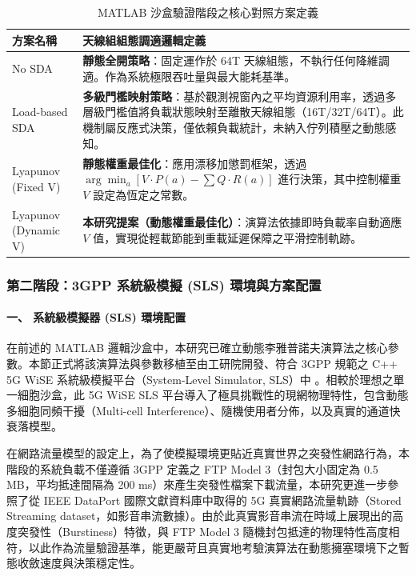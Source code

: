 \begin{table}[htbp]
\centering
\caption{MATLAB 沙盒驗證階段之核心對照方案定義}
\label{tab:matlab_schemes}
\renewcommand{\arraystretch}{1.5}
\begin{tabularx}{\textwidth}{|p{}|X|} %
\hline
\textbf{方案名稱} & \textbf{天線組組態調適邏輯定義} \\ \hline
No SDA & \textbf{靜態全開策略}：固定運作於 64T 天線組態，不執行任何降維調適。作為系統極限吞吐量與最大能耗基準。 \\ \hline
Load-based SDA & \textbf{多級門檻映射策略}：基於觀測視窗內之平均資源利用率，透過多層級門檻值將負載狀態映射至離散天線組態（16T/32T/64T）。此機制屬反應式決策，僅依賴負載統計，未納入佇列積壓之動態感知。 \\ \hline
Lyapunov \newline (Fixed V) & \textbf{靜態權重最佳化}：應用漂移加懲罰框架，透過 $\arg \min_{a} [V \cdot P(a) - \sum Q \cdot R(a)]$ 進行決策，其中控制權重 $V$ 設定為恆定之常數。 \\ \hline
Lyapunov \newline (Dynamic V) & \textbf{本研究提案（動態權重最佳化）}：演算法依據即時負載率自動適應 $V$ 值，實現從輕載節能到重載延遲保障之平滑控制軌跡。 \\ \hline
\end{tabularx}
\end{table}


\subsubsection{第二階段：3GPP 系統級模擬 (SLS) 環境與方案配置} %

\paragraph{一、 系統級模擬器 (SLS) 環境配置}

在前述的 MATLAB 邏輯沙盒中，本研究已確立動態李雅普諾夫演算法之核心參數。本節正式將該演算法與參數移植至由工研院開發、符合 3GPP 規範之 C++ 5G WiSE 系統級模擬平台（System-Level Simulator, SLS）中 \cite{jao_wise_5g}。相較於理想之單一細胞沙盒，此 5G WiSE SLS 平台導入了極具挑戰性的現網物理特性，包含動態多細胞同頻干擾（Multi-cell Interference）、隨機使用者分佈，以及真實的通道快衰落模型。

在網路流量模型的設定上，為了使模擬環境更貼近真實世界之突發性網路行為，本階段的系統負載不僅遵循 3GPP 定義之 FTP Model 3（封包大小固定為 0.5 MB，平均抵達間隔為 200 ms）來產生突發性檔案下載流量，本研究更進一步參照了從 IEEE DataPort 國際文獻資料庫中取得的 5G 真實網路流量軌跡（Stored Streaming dataset，如影音串流數據）。由於此真實影音串流在時域上展現出的高度突發性（Burstiness）特徵，與 FTP Model 3 隨機封包抵達的物理特性高度相符，以此作為流量驗證基準，能更嚴苛且真實地考驗演算法在動態擁塞環境下之暫態收斂速度與決策穩定性。

